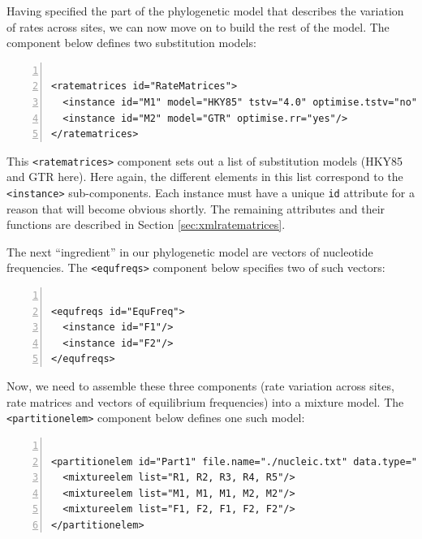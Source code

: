 \documentclass[a4paper,12pt]{article}
\newcommand{\x}[1]{\texttt{#1}}
\begin{document}
Having specified the  part of the phylogenetic  model that describes the variation  of rates across
sites,  we can  now move  on  to build  the rest  of the  model.   The component  below defines  two
substitution models:

\vspace{0.2cm}
\begin{Verbatim}[frame=single, label=Rate matrices, samepage=true, baselinestretch=0.5,
  fontsize=\small, numbers=left]

<ratematrices id="RateMatrices">
  <instance id="M1" model="HKY85" tstv="4.0" optimise.tstv="no"/>
  <instance id="M2" model="GTR" optimise.rr="yes"/>
</ratematrices>
\end{Verbatim}

This \x{<ratematrices>} component sets out a list  of substitution models (HKY85 and GTR here). Here
again, the  different elements in  this list correspond  to the \x{<instance>}  sub-components. Each
instance must  have a unique \x{id}  attribute for a reason  that will become obvious  shortly.  The
remaining attributes and their functions are described in Section \ref{sec:xmlratematrices}.

The next ``ingredient'' in our phylogenetic model are vectors of nucleotide frequencies. The
\x{<equfreqs>} component below specifies two of such vectors:


\vspace{0.2cm}
\begin{Verbatim}[frame=single, label=Equilibrium frequencies, samepage=true, baselinestretch=0.5,
  fontsize=\small, numbers=left]

<equfreqs id="EquFreq">
  <instance id="F1"/>
  <instance id="F2"/>
</equfreqs>

\end{Verbatim}

Now, we need to assemble these three components (rate variation across sites, rate matrices and
vectors of equilibrium frequencies) into a mixture model. The \x{<partitionelem>} component below
defines one such model:

\vspace{0.2cm}
\begin{Verbatim}[frame=single, label=Mixture model, samepage=true, baselinestretch=0.5,
  fontsize=\small, numbers=left]

<partitionelem id="Part1" file.name="./nucleic.txt" data.type="nt">
  <mixtureelem list="R1, R2, R3, R4, R5"/>
  <mixtureelem list="M1, M1, M1, M2, M2"/>
  <mixtureelem list="F1, F2, F1, F2, F2"/>
</partitionelem>

\end{Verbatim}
\end{document}
